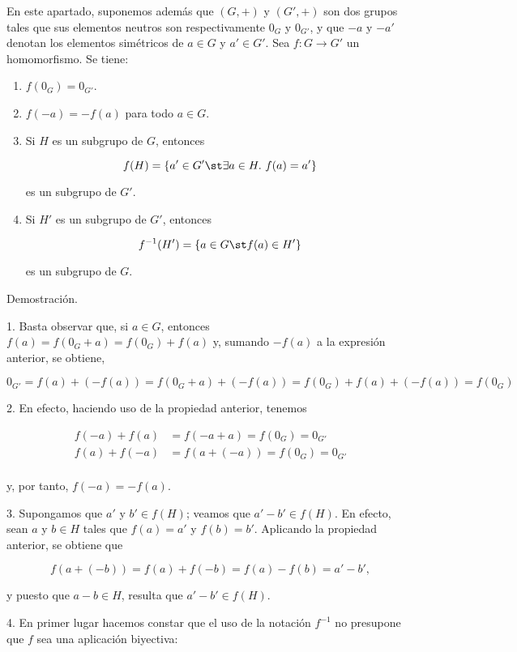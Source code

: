 En este apartado, suponemos además que $(G, +)$ y $(G', +)$ son dos grupos
tales que sus elementos neutros son respectivamente $0_G$ y $0_{G'}$, y que
${-a}$ y ${-a'}$ denotan los elementos simétricos de $a \in G$ y $a' \in
G'$. Sea $f: G \longrightarrow G'$ un homomorfismo. Se tiene:

\begin{enumerate}
  \item $f(0_G) = 0_{G'}$.
  \item $f({-a}) = {-f(a)}$ para todo $a \in G$.
  \item Si $H$ es un subgrupo de $G$, entonces

    $$ f(H) = \{a' \in G' \st \exists a \in H.\ f(a) = a'\} $$

    \noindent es un subgrupo de $G'$.

  \item Si $H'$ es un subgrupo de $G'$, entonces

    $$ f^{-1}(H') = \{a \in G \st f(a) \in H'\} $$

    \noindent es un subgrupo de $G$.
\end{enumerate}

Demostración.

1. Basta observar que, si $a \in G$, entonces $f(a) = f(0_G + a) = f(0_G) +
f(a)$ y, sumando ${-f(a)}$ a la expresión anterior, se obtiene,

$$ 0_{G'} = f(a) + ({-f(a)}) = f(0_G + a) + ({-f(a)}) = f(0_G) + f(a) +
({-f(a)}) = f(0_G) $$

2. En efecto, haciendo uso de la propiedad anterior, tenemos

\begin{align*}
  f({-a}) + f(a) &= f({-a} + a) = f(0_G) = 0_{G'} \\
  f(a) + f({-a}) &= f(a + ({-a})) = f(0_G) = 0_{G'} \\
\end{align*}

\noindent y, por tanto, $f({-a}) = {-f(a)}$.

3. Supongamos que $a'$ y $b' \in f(H)$; veamos que $a' - b' \in f(H)$. En
efecto, sean $a$ y $b \in H$ tales que $f(a) = a'$ y $f(b) = b'$. Aplicando
la propiedad anterior, se obtiene que

$$ f(a + ({-b})) = f(a) + f({-b}) = f(a) - f(b) = a' - b', $$

\noindent y puesto que $a - b \in H$, resulta que $a' - b' \in f(H)$.

4. En primer lugar hacemos constar que el uso de la notación $f^{-1}$ no
presupone que $f$ sea una aplicación biyectiva:


